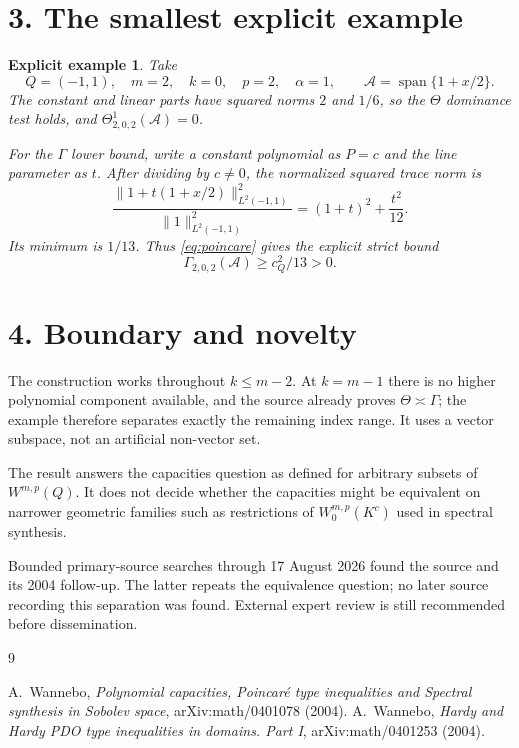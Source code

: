 \documentclass[10pt,a4paper]{article}
\newtheorem{example}{Explicit example}
\newcommand{\cA}{\mathcal A}
\newcommand{\norm}[1]{\lVert #1\rVert}
\begin{document}
\section*{3. The smallest explicit example}

\begin{example}
Take
\[
 Q=(-1,1),\quad m=2,\quad k=0,\quad p=2,\quad\alpha=1,
 \qquad \cA=\operatorname{span}\{1+x/2\}.
\]
The constant and linear parts have squared norms $2$ and $1/6$, so the
$\Theta$ dominance test holds, and $\Theta_{2,0,2}^1(\cA)=0$.

For the $\Gamma$ lower bound, write a constant polynomial as $P=c$ and the
line parameter as $t$.  After dividing by $c\ne0$, the normalized squared
trace norm is
\[
 \frac{\norm{1+t(1+x/2)}_{L^2(-1,1)}^2}{\norm1_{L^2(-1,1)}^2}
 =(1+t)^2+\frac{t^2}{12}.
\]
Its minimum is $1/13$.  Thus \eqref{eq:poincare} gives the explicit strict
bound
\[
 \Gamma_{2,0,2}(\cA)\ge c_Q^2/13>0.
\]
\end{example}

\section*{4. Boundary and novelty}

The construction works throughout $k\le m-2$.  At $k=m-1$ there is no
higher polynomial component available, and the source already proves
$\Theta\asymp\Gamma$; the example therefore separates exactly the remaining
index range.  It uses a vector subspace, not an artificial non-vector set.

The result answers the capacities question as defined for arbitrary subsets
of $W^{m,p}(Q)$.  It does not decide whether the capacities might be
equivalent on narrower geometric families such as restrictions of
$W_0^{m,p}(K^c)$ used in spectral synthesis.

Bounded primary-source searches through 17 August 2026 found the source and
its 2004 follow-up.  The latter repeats the equivalence question; no later
source recording this separation was found.  External expert review is still
recommended before dissemination.

\begin{thebibliography}{9}\small\raggedright
{}
A.~Wannebo,
\emph{Polynomial capacities, Poincaré type inequalities and Spectral
synthesis in Sobolev space}, arXiv:math/0401078 (2004).
A.~Wannebo,
\emph{Hardy and Hardy PDO type inequalities in domains. Part I},
arXiv:math/0401253 (2004).
\end{thebibliography}
\end{document}
